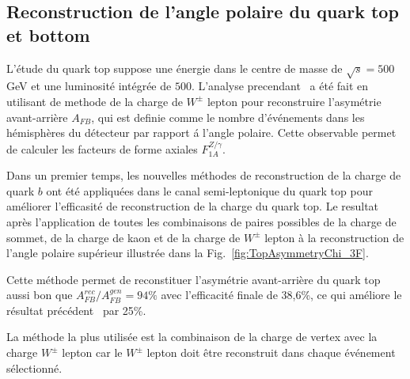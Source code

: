 \newpage
\subsection*{Reconstruction de l'angle polaire du quark top et bottom}
L’\'etude du quark top suppose une \'energie dans le centre de masse de $\sqrt{s} = 500$\,GeV et une luminosit\'e int\'egr\'ee de $500$\ifb. L'analyse precendant~\cite{bib:ILCTOP} a \'et\'e fait  en utilisant de methode de la charge de $W^\pm$ lepton pour reconstruire  l'asymétrie avant-arrière $A_ {FB}$, qui est definie comme le nombre d’\'ev\'enements
dans les h\'emisph\`eres du d\'etecteur par rapport \'a l'angle polaire.  Cette observable permet de calculer les facteurs de forme axiales $F_{1A}^{Z/\gamma}$.


Dans un premier temps, les nouvelles méthodes de reconstruction de la charge de quark $b$ ont été appliquées dans le canal semi-leptonique du quark top pour améliorer l'efficasit\'e de reconstruction de la charge du quark top.
Le resultat après l'application de toutes les combinaisons de paires possibles de la charge de sommet, de la charge de kaon et de la charge de $W^\pm$ lepton à la reconstruction de l'angle polaire supérieur illustrée dans la Fig.~\ref {fig:TopAsymmetryChi_3F}.

Cette méthode permet de reconstituer l'asymétrie avant-arrière du quark top aussi bon que $A_ {FB}^{rec} / A^{gen}_{FB} = 94\%$ avec l'efficacité finale de 38,6\%, ce qui améliore le résultat précédent~\cite{bib:ILCTOP} par 25\%.

La méthode la plus utilisée est la combinaison de la charge de vertex avec la charge $W^\pm$ lepton car le $ W^\pm$ lepton doit être reconstruit dans chaque événement sélectionné.

